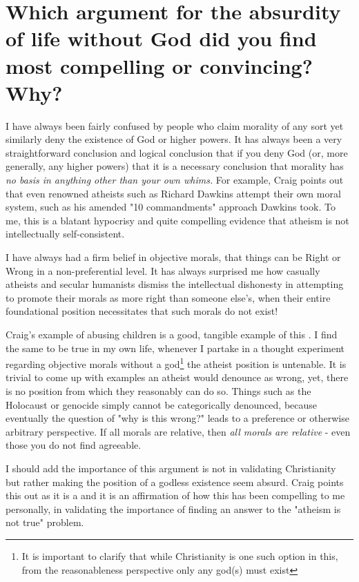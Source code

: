 \documentclass[12pt]{turabian-researchpaper}
\begin{document}
\section{Which argument for the absurdity of life without God did you find most compelling or convincing? Why?}
I have always been fairly confused by people who claim morality of any sort yet similarly deny the existence of God or higher powers.  It has always been a very straightforward conclusion and logical conclusion that if you deny God (or, more generally, any higher powers) that it is a necessary conclusion that morality has \textit{no basis in anything other than your own whims.} For example, Craig points out that even renowned atheists such as Richard Dawkins attempt their own moral system, such as his amended "10 commandments"\autocite[pg.81]{craig2008reasonable} approach Dawkins took. To me, this is a blatant hypocrisy and quite compelling evidence that atheism is not intellectually self-consistent.

I have always had a firm belief in objective morals, that things can be Right or Wrong in a non-preferential level. It has always surprised me how casually atheists and secular humanists dismiss the intellectual dishonesty in attempting to promote their morals as more right than someone else's, when their entire foundational position necessitates that such morals do not exist!

Craig's example of abusing children is a good, tangible example of this \autocite[pg. 87-88]{craig2008reasonable}. I find the same to be true in my own life, whenever I partake in a thought experiment regarding objective morals without a god\footnote{It is important to clarify that while Christianity is one such option in this, from the reasonableness perspective only any god(s) must exist} the atheist position is untenable. It is trivial to come up with examples an atheist would denounce as wrong, yet, there is no position from which they reasonably can do so. Things such as the Holocaust or genocide simply cannot be categorically denounced, because eventually the question of "why is this wrong?" leads to a preference or otherwise arbitrary perspective. If all morals are relative, then \textit{all morals are relative} - even those you do not find agreeable.

I should add the importance of this argument is not in validating Christianity but rather making the position of a godless existence seem absurd. Craig points this out as it is a and it is an affirmation of how this has been compelling to me personally, in validating the importance of finding an answer to the "atheism is not true" problem.
\end{document}
